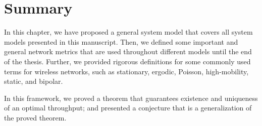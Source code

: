 

\section{Summary} \label{sec:summ_P2_00}

In this chapter, we have proposed a general system model that covers all system models presented in this manuscript.
%
Then, we defined some important and general network metrics that are used throughout different models until the end of the thesis.
%
Further, we provided rigorous definitions for some commonly used terms for wireless networks, such as stationary, ergodic, Poisson, high-mobility, static, and bipolar.

In this framework, we proved a theorem that guarantees existence and uniqueness of an optimal throughput; and presented a conjecture that is a generalization of the proved theorem.